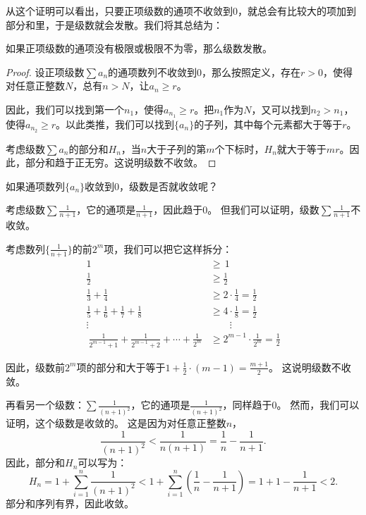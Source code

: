 \documentclass[12pt,UTF8,fontset=none]{ctexbook}
\begin{document}
从这个证明可以看出，只要正项级数的通项不收敛到$0$，就总会有比较大的项加到部分和里，于是级数就会发散。我们将其总结为：
\begin{tm}
    如果正项级数的通项没有极限或极限不为零，那么级数发散。
\end{tm}
\begin{proof}
    设正项级数$\sum a_n$的通项数列不收敛到$0$，那么按照定义，存在$r>0$，使得对任意正整数$N$，总有$n > N$，让$a_n \geqslant r$。

    因此，我们可以找到第一个$n_1$，使得$a_{n_1} \geqslant r$。把$n_1$作为$N$，又可以找到$n_2 > n_1$，
    使得$a_{n_2} \geqslant r$。以此类推，我们可以找到$\{a_n\}$的子列，其中每个元素都大于等于$r$。

    考虑级数$\sum a_n$的部分和$H_n$，当$n$大于子列的第$m$个下标时，$H_n$就大于等于$mr$。因此，部分和趋于正无穷。这说明级数不收敛。
\end{proof}

如果通项数列$\{a_n\}$收敛到$0$，级数是否就收敛呢？

考虑级数$\sum \frac{1}{n+1}$，它的通项是$\frac{1}{n+1}$，因此趋于$0$。
但我们可以证明，级数$\sum \frac{1}{n+1}$不收敛。

考虑数列$\{\frac{1}{n+1}\}$的前$2^m$项，我们可以把它这样拆分：
\begin{align*}
    1 \, &\geqslant \, 1  \\
    \frac{1}{2} &\geqslant \frac{1}{2}  \\
    \frac{1}{3} + \frac{1}{4} &\geqslant 2 \cdot \frac{1}{4} = \frac{1}{2}  \\
    \frac{1}{5} + \frac{1}{6} + \frac{1}{7} + \frac{1}{8} &\geqslant 4 \cdot \frac{1}{8} = \frac{1}{2}  \\
    \vdots \qquad & \qquad \vdots  \\\
    \frac{1}{2^{m-1}+1} + \frac{1}{2^{m-1}+2} + \cdots + \frac{1}{2^{m}} &\geqslant 2^{m-1} \cdot \frac{1}{2^{m}} = \frac{1}{2}  
\end{align*}

因此，级数前$2^m$项的部分和大于等于$1 + \frac12 \cdot (m - 1) = \frac{m+1}{2}$。
这说明级数不收敛。

再看另一个级数：$\sum \frac{1}{(n+1)^2}$，它的通项是$\frac{1}{(n+1)^2}$，同样趋于$0$。
然而，我们可以证明，这个级数是收敛的。
这是因为对任意正整数$n$，
$$ \frac{1}{(n+1)^2} < \frac{1}{n(n+1)} = \frac{1}{n} - \frac{1}{n+1}.$$
因此，部分和$H_n$可以写为：
$$ H_n = 1 + \sum_{i=1}^n \frac{1}{(n+1)^2} < 1 + \sum_{i=1}^n \left(\frac{1}{n} - \frac{1}{n+1}\right) = 1 + 1 - \frac{1}{n+1} < 2. $$
部分和序列有界，因此收敛。
\end{document}
